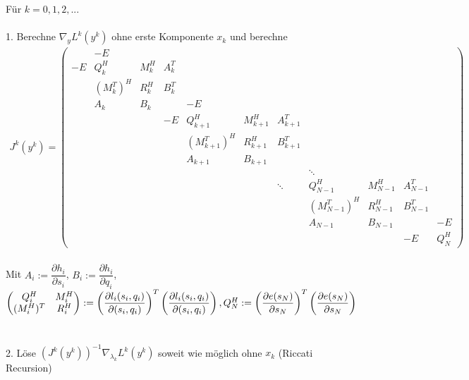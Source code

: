 \documentclass[12pt,a4paper]{article}
\begin{document}
  Für $k = 0,1,2,...$ \\
  \\
  1. Berechne $\nabla_y L^{k}(y^{k})$ ohne erste Komponente $x_k$ und berechne
  \begin{align*} 
  J^{k}(y^{k}) =
  \begin{pmatrix}
    & -E  &     &     &     &     &     &     &     &     &     \\
-E  & Q_k^{H} & M_k^{H} & A_k^{T} &  &    &     &     &     &     &     \\
    & (M_k^{T})^{H} & R_k^{H} & B_k^{T} &   &    &    &    &    &   &     \\
    & A_k & B_k &     & -E  &     &     &     &     &     &     \\
    &  &  & -E  & Q_{k+1}^{H} & M_{k+1}^{H} & A_{k+1}^{T} &  &  &  &  \\
    &  &  &     & (M_{k+1}^{T})^{H} & R_{k+1}^{H} & B_{k+1}^{T} &  &  &  &  \\
    &  &  &     & A_{k+1} & B_{k+1} &    &    &     &     &     \\
    &  &  &     &    &    &   & \ddots &     &     &     \\
    &  &  &   &  &  & \ddots & Q_{N-1}^{H} & M_{N-1}^{H} & A_{N-1}^{T} &  \\
    &  &  &   &  &  &    & (M_{N-1}^{T})^{H} & R_{N-1}^{H} & B_{N-1}^{T} &  \\
    &  &  &   &  &  &    & A_{N-1}     & B_{N-1} &    & -E \\
    &  &  &     &    &    &     &      &     & -E &  Q_N^{H} 
\end{pmatrix}
  \end{align*}
  \\
  Mit $ A_i := \dfrac{\partial h_i}{\partial s_i} $, 
  $ B_i := \dfrac{\partial h_i}{\partial q_i} $,
  $
  \begin{pmatrix}
  Q_i^{H} & M_i^{H} \\
  (M_i^{H})^{T} & R_i^{H}
  \end{pmatrix} :=
  \left( 
  \dfrac{\partial l_i (s_i,q_i)}{\partial (s_i,q_i)}
  \right) ^{T}
  \left( 
  \dfrac{\partial l_i (s_i,q_i)}{\partial (s_i,q_i)}
  \right)
  , \ \\
  Q_N^{H} :=
  \left( 
  \dfrac{\partial e (s_N)}{\partial s_N}
  \right) ^{T}
  \left( 
  \dfrac{\partial e (s_N)}{\partial s_N}
  \right)
  $\\
  \\
  \\
  2. Löse $ (J^{k}(y^{k}))^{-1} \nabla_{\lambda_k} L^{k}(y^{k}) $ soweit wie möglich ohne $ x_k $ (Riccati Recursion)\\
\end{document}
